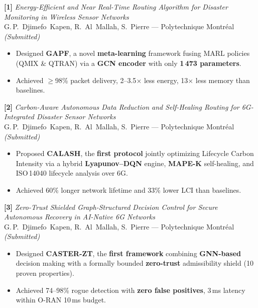 \documentclass[10pt,a4paper,sans]{moderncv}
\begin{document}
\textbf{[1]} \textit{Energy-Efficient and Near Real-Time Routing Algorithm for
Disaster Monitoring in Wireless Sensor Networks}\\
G.\,P.~Djimefo~Kapen, R.~Al~Mallah, S.~Pierre --- Polytechnique
Montréal \hfill \textit{(Submitted)}
\begin{itemize}[leftmargin=1.5em, topsep=2pt, itemsep=0pt, parsep=0pt]
  \item Designed \textbf{GAPF}, a novel \textbf{meta-learning} framework fusing
        MARL policies (QMIX \& QTRAN) via a \textbf{GCN encoder} with only
        \textbf{1\,473 parameters}.
  \item Achieved $\geq$98\% packet delivery, 2--3.5$\times$ less energy,
        13$\times$ less memory than baselines.
\end{itemize}

\vspace{0.4em}
\textbf{[2]} \textit{Carbon-Aware Autonomous Data Reduction and Self-Healing
Routing for 6G-Integrated Disaster Sensor Networks}\\
G.\,P.~Djimefo~Kapen, R.~Al~Mallah, S.~Pierre --- Polytechnique
Montréal \hfill \textit{(Submitted)}
\begin{itemize}[leftmargin=1.5em, topsep=2pt, itemsep=0pt, parsep=0pt]
  \item Proposed \textbf{CALASH}, the \textbf{first protocol} jointly optimizing
        Lifecycle Carbon Intensity via a hybrid \textbf{Lyapunov--DQN} engine,
        \textbf{MAPE-K} self-healing, and ISO\,14040 lifecycle analysis over 6G.
  \item Achieved 60\% longer network lifetime and 33\% lower LCI than baselines.
\end{itemize}

\vspace{0.4em}
\textbf{[3]} \textit{Zero-Trust Shielded Graph-Structured Decision Control for
Secure Autonomous Recovery in AI-Native 6G Networks}\\
G.\,P.~Djimefo~Kapen, R.~Al~Mallah, S.~Pierre --- Polytechnique
Montréal \hfill \textit{(Submitted)}
\begin{itemize}[leftmargin=1.5em, topsep=2pt, itemsep=0pt, parsep=0pt]
  \item Designed \textbf{CASTER-ZT}, the \textbf{first framework} combining
        \textbf{GNN-based} decision making with a formally bounded
        \textbf{zero-trust} admissibility shield (10 proven properties).
  \item Achieved 74--98\% rogue detection with \textbf{zero false positives},
        3\,ms latency within O-RAN 10\,ms budget.
\end{itemize}
\end{document}
